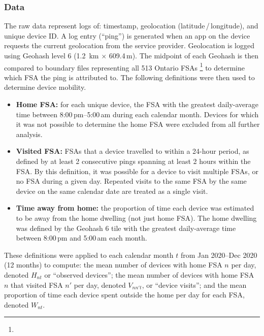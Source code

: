 \subsubsection{Data}\label{app.mob.data}
The raw data represent logs of: timestamp, geolocation (latitude\,/\,longitude), and unique device ID.
A log entry (``ping'') is generated when an app on the device
requests the current geolocation from the service provider.
Geolocation is logged using Geohash level 6 (1.2 \,km $\times$ 609.4\,m).
The midpoint of each Geohash is then compared to boundary files representing all 513 Ontario FSAs%
\footnote{}
to determine which FSA the ping is attributed to.
The following definitions were then used to determine device mobility.
\begin{itemize}
  \item \textbf{Home FSA:} for each unique device,
  the FSA with the greatest daily-average time between 8:00\,pm--5:00\,am during each calendar month.
  Devices for which it was not possible to determine the home FSA were excluded from all further analysis.
  \item \textbf{Visited FSA:} FSAs that a device travelled to within a 24-hour period,
  as defined by at least 2 consecutive pings spanning at least 2 hours within the FSA.
  By this definition, it was possible for a device to visit multiple FSAs, or no FSA during a given day.
  Repeated visits to the same FSA by the same device on the same calendar date are treated as a single visit.
  \item \textbf{Time away from home:} the proportion of time each device
  was estimated to be away from the home dwelling (not just home FSA).
  The home dwelling was defined by the Geohash 6 tile
  with the greatest daily-average time between 8:00\,pm and 5:00\,am each month.
\end{itemize}
\par
These definitions were applied to each calendar month $t$ from Jan 2020--Dec 2020 (12 months) to compute:
the mean number of devices with home FSA $n$ per day, denoted $H_{nt}$ or ``observed devices'';
the mean number of devices with home FSA $n$ that visited FSA $n'$ per day, denoted $V_{nn't}$, or ``device visits''; and
the mean proportion of time each device spent outside the home per day for each FSA, denoted $W_{nt}$.
